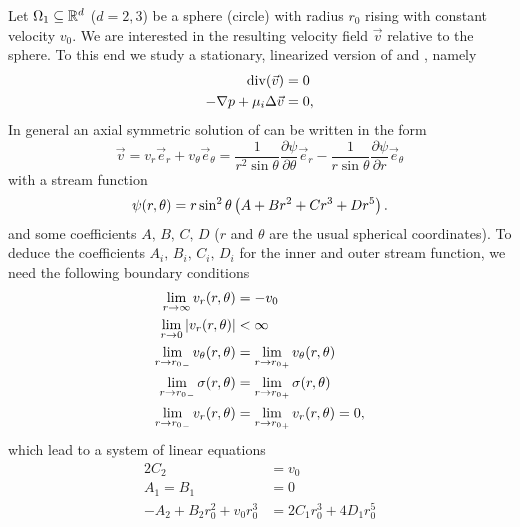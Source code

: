 \begin{ex}
Let $\Omega_1\subseteq\mathbb{R}^d$ ($d=2,3$) be a sphere (circle) with radius $r_0$ rising with constant velocity $v_0$. We are interested in the resulting velocity field $\vec v$ relative to the sphere. To this end we study a stationary, linearized version of  and , namely
\begin{subequations}
	\label{eq:stokes}
	\begin{align}
		\mathrm{div}\!\left(\vec v\right)&=0\\
		-\nabla p+\mu_i\Delta\vec v&=0,
	\end{align}
\end{subequations}
In general an axial symmetric solution of  can be written in the form 
\begin{equation}
	\vec v = v_r \vec e_r+v_\theta \vec e_\theta=\frac{1}{r^2\sin\theta}\frac{\partial \psi}{\partial \theta}\vec e_r-\frac{1}{r\sin\theta}\frac{\partial \psi}{\partial r}\vec e_\theta
\end{equation}
with a stream function
\begin{equation}
\psi\!\left(r,\theta\right)=r\sin^2\theta \left(A+Br^2+Cr^3+Dr^5\right). 
\end{equation}
and some coefficients $A,\,B,\,C,\,D$ ($r$ and $\theta$ are the usual spherical coordinates).
To deduce the coefficients $A_i,\,B_i,\,C_i,\,D_i$ for the inner and outer stream function, we need the following boundary conditions
\begin{subequations}
	\begin{align}
		\lim_{r\to\infty}v_r(r,\theta)&=-v_0\\
		\lim_{r\to0}\left|v_r(r,\theta)\right|&<\infty\\
		\lim_{r\to {r_0}_-}v_\theta\!\left(r,\theta\right)&=\lim_{r\to {r_0}_+}v_\theta\!\left(r,\theta\right)\\
		\lim_{r\to {r_0}_-}\sigma\!\left(r,\theta\right)&=\lim_{r\to {r_0}_+}\sigma\!\left(r,\theta\right)\\
		\lim_{r\to {r_0}_-}v_r\!\left(r,\theta\right)&=\lim_{r\to {r_0}_+}v_r\!\left(r,\theta\right)=0,
	\end{align}
\end{subequations}
which lead to a system of linear equations
\begin{subequations}
\label{eq:linsys}
	\begin{align}
		2 C_2&=v_0\\
		A_1=B_1&=0\\
		-A_2+B_2r_0^2+v_0r_0^3&=2C_1r_0^3+4D_1r_0^5\\

\end{align}
\end{subequations}
\end{ex}
